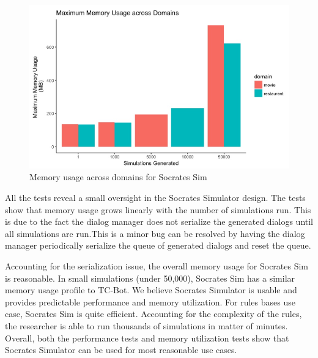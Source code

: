 \begin{figure}[h!]
	\label{fig:mem_usage_cd}
	\includegraphics[width=\linewidth]{diagrams/mem_usage_domains.jpeg}
	\caption{ Memory usage across domains for Socrates Sim}
\end{figure}

All the tests reveal a small oversight in the Socrates Simulator design. The tests show that memory usage grows linearly with the number of simulations run. This is due to the fact the dialog manager does not serialize the generated dialogs until all simulations are run.This is a minor bug can be resolved by having the dialog manager periodically serialize the queue of generated dialogs and reset the queue. 

Accounting for the serialization issue, the overall memory usage for Socrates Sim is reasonable. In small simulations (under 50,000), Socrates Sim has a similar memory usage profile to TC-Bot. We believe Socrates Simulator is usable and provides predictable performance and memory utilization. For rules bases use case, Socrates Sim is quite efficient. Accounting for the complexity of the rules, the researcher is able to run thousands of simulations in matter of minutes. Overall, both the performance tests and memory utilization tests show that Socrates Simulator can be used for most reasonable use cases. 

